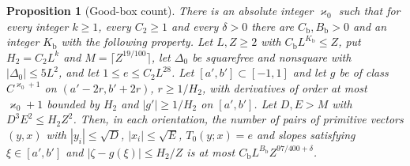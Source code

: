 \documentclass[11pt,reqno]{amsart}
\newtheorem{proposition}[theorem]{Proposition}
\theoremstyle{definition}
\theoremstyle{remark}
\numberwithin{equation}{section}
\begin{document}
\begin{proposition}[Good-box count]\label{prop:A3good}
There is an absolute integer $\varkappa_0$
such that for every integer $k\ge1$, every $C_2\ge1$ and every $\delta>0$
there are $C_{\mathrm b},B_{\mathrm b}>0$ and an integer $K_{\mathrm b}$
with the following property. Let $L,Z\ge2$ with
$C_{\mathrm b}L^{K_{\mathrm b}}\le Z$, put $H_2=C_2L^k$ and
$M=\lceil Z^{19/100}\rceil$, let $\Delta_0$ be squarefree and nonsquare with
$|\Delta_0|\le5L^2$, and let $1\le e\le C_2L^{28}$. Let
$[a',b']\subset[-1,1]$ and let $g$ be of class $C^{\varkappa_0+1}$ on
$(a'-2r,b'+2r)$, $r\ge1/H_2$, with derivatives of order at most
$\varkappa_0+1$ bounded by $H_2$ and $|g'|\ge1/H_2$ on $[a',b']$. Let
$D,E>M$ with $D^3E^2\le H_2Z^2$. Then, in each orientation, the number of
pairs of primitive vectors $(y,x)$ with $|y_i|\le\sqrt D$,
$|x_i|\le\sqrt E$, $T_0(y;x)=e$ and slopes satisfying $\xi\in[a',b']$ and
$|\zeta-g(\xi)|\le H_2/Z$ is at most
$C_{\mathrm b}L^{B_{\mathrm b}}Z^{97/400+\delta}$.
\end{proposition}
\end{document}
